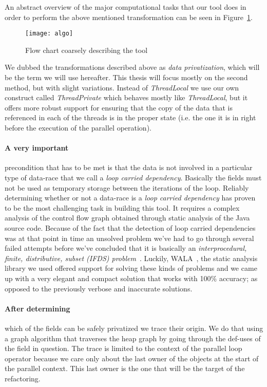 An abstract overview of the major computational tasks that our tool does in
order to perform the above mentioned transformation can be seen in
Figure~\ref{algo}.

\begin{figure}[h!]
\begin{center}
  \texttt{[image: algo]}
  \caption{Flow chart coarsely describing the tool}
  \label{algo}
\end{center}
\end{figure}

We dubbed the transformations described above as \emph{data privatization},
which will be the term we will use hereafter. This thesis will focus mostly on
the second method, but with slight variations. Instead of \emph{ThreadLocal} we use
our own construct called \emph{ThreadPrivate} which behaves mostly like
\emph{ThreadLocal}, but it offers more robust support for ensuring that the
copy of the data that is referenced in each of the threads is in the proper
state (i.e. the one it is in right before the execution of the parallel operation).


\paragraph{A very important} precondition that has to be met is that the data is
not involved in a particular type of data-race that we call a \emph{loop carried
dependency}. Basically the fields must not be used as temporary storage between
the iterations of the loop. Reliably determining whether or not a data-race is a
\emph{loop carried dependency} has proven to be the most challenging task in
building this tool. It requires a complex analysis of the control flow graph
obtained through static analysis of the Java source code.
Because of the fact that the detection of loop carried dependencies was at that
point in time an unsolved problem we've had to go through several failed
attempts before we've concluded that it is basically an \emph{interprocedural,
finite, distributive, subset (IFDS) problem}~\cite{IFDS}. Luckily,
WALA~\cite{wala-site}, the static analysis library we used offered support for
solving these kinds of problems and we came up with a very elegant and compact
solution that works with 100\% accuracy; as opposed to the previously verbose
and inaccurate solutions.

\paragraph{After determining} which of the fields can be safely privatized we
trace their origin. We do that using a graph algorithm that traverses the heap
graph by going through the def-uses of the field in question. The trace is
limited to the context of the parallel loop operator because we care only about
the last owner of the objects at the start of the parallel context. This last
owner is the one that will be the target of the refactoring.

